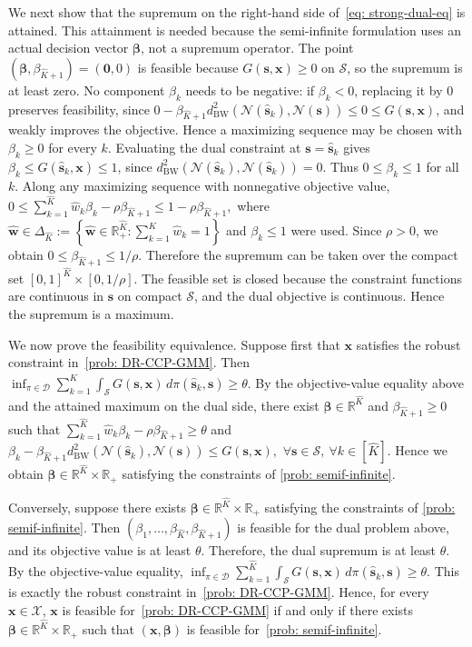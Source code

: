 \documentclass[opre,sglanonrev]{informs4}
\newcommand{\mD}{\mathcal{D}}
\newcommand{\mS}{\mathcal{S}}
\newcommand{\mN}{\mathcal{N}}
\newcommand{\mX}{\mathcal{X}}
\newcommand{\bbeta}{\bm{\beta}}
\newcommand{\bzero}{\bm{0}}
\newcommand{\bs}{\bm{s}}
\newcommand{\bw}{\bm{w}}
\newcommand{\bx}{\bm{x}}
\begin{document}
{\begin{APPENDICES}
We next show that the supremum on the right-hand side of~\eqref{eq: strong-dual-eq} is attained. This
attainment is needed because the semi-infinite formulation uses an actual
decision vector \(\bbeta\), not a supremum operator. The point
\((\bbeta,\beta_{\hat{K}+1})=(\bzero,0)\) is feasible because \(G(\bs,\bx)\ge0\) on
\(\mS\), so the supremum is at least zero. No component \(\beta_k\) needs to be
negative: if \(\beta_k<0\), replacing it by \(0\) preserves feasibility, since
\(0-\beta_{\hat{K}+1} d_{\mathrm{BW}}^2(\mN(\hat{\bs}_k),\mN(\bs))\le0\le G(\bs,\bx)\),
and weakly improves the objective. Hence a maximizing sequence may be chosen
with \(\beta_k\ge0\) for every \(k\). Evaluating the dual constraint at
\(\bs=\hat{\bs}_k\) gives \(\beta_k\le G(\hat{\bs}_k,\bx)\le1\), since
\(d_{\mathrm{BW}}^2(\mN(\hat{\bs}_k),\mN(\hat{\bs}_k))=0\). Thus
\(0\le\beta_k\le1\) for all \(k\). Along any maximizing sequence with
nonnegative objective value, $0\le
\sum_{k=1}^{\hat K}\hat w_k\beta_k-\rho\beta_{\hat{K}+1}
\le
1-\rho\beta_{\hat{K}+1},$
where \(\hat{\bw}\in\Delta_{\hat K}
:=
\left\{
\hat{\bw}\in\mathbb R_+^{\hat K}:
\sum_{k=1}^{\hat K}\hat w_k=1
\right\}\)
and \(\beta_k\le1\) were used. Since
\(\rho>0\), we obtain \(0\le\beta_{\hat{K}+1}\le1/\rho\). Therefore the supremum can be
taken over the compact set \([0,1]^{\hat K}\times[0,1/\rho]\). The feasible
set is closed because the constraint functions are continuous in \(\bs\) on
compact \(\mS\), and the dual objective is continuous. Hence the supremum is a
maximum.

We now prove the feasibility equivalence. Suppose first that \(\bx\) satisfies
the robust constraint in~\eqref{prob: DR-CCP-GMM}. Then $\inf_{\pi\in\mD}
\sum_{k=1}^{\hat K}
\int_{\mS}G(\bs,\bx)\,d\pi(\hat{\bs}_k,\bs)
\ge\theta$.
By the objective-value equality above and the attained maximum on the dual
side, there exist \(\bbeta\in\mathbb R^{\hat K}\) and \(\beta_{\hat{K}+1}\ge0\) such
that $\sum_{k=1}^{\hat K}\hat w_k\beta_k-\rho\beta_{\hat{K}+1}\ge\theta$ 
and $\beta_k-\beta_{\hat{K}+1}
d_{\mathrm{BW}}^2
\left(
\mN(\hat{\bs}_k),\mN(\bs)
\right)
\le
G(\bs,\bx),
\,\,
\forall \bs\in\mS,\ \forall k\in[\hat K]$. 
Hence we obtain
\(\bbeta\in\mathbb R^{\hat K}\times\mathbb R_+\) satisfying the constraints of
\eqref{prob: semif-infinite}.

Conversely, suppose there exists
\(\bbeta\in\mathbb R^{\hat K}\times\mathbb R_+\) satisfying the constraints of
\eqref{prob: semif-infinite}. Then
\((\beta_1,\ldots,\beta_{\hat K},\beta_{\hat{K}+1})\) is feasible for the dual problem
above, and its objective value is at least \(\theta\). Therefore, the dual
supremum is at least \(\theta\). By the objective-value equality,
\(
\inf_{\pi\in\mD}
\sum_{k=1}^{\hat K}
\int_{\mS}G(\bs,\bx)\,d\pi(\hat{\bs}_k,\bs)
\ge\theta\).
This is exactly the robust constraint in~\eqref{prob: DR-CCP-GMM}. Hence, for
every \(\bx\in\mX\), \(\bx\) is feasible for~\eqref{prob: DR-CCP-GMM} if and
only if there exists \(\bbeta\in\mathbb R^{\hat K}\times\mathbb R_+\) such
that \((\bx,\bbeta)\) is feasible for~\eqref{prob: semif-infinite}.


\end{APPENDICES}}
\end{document}

